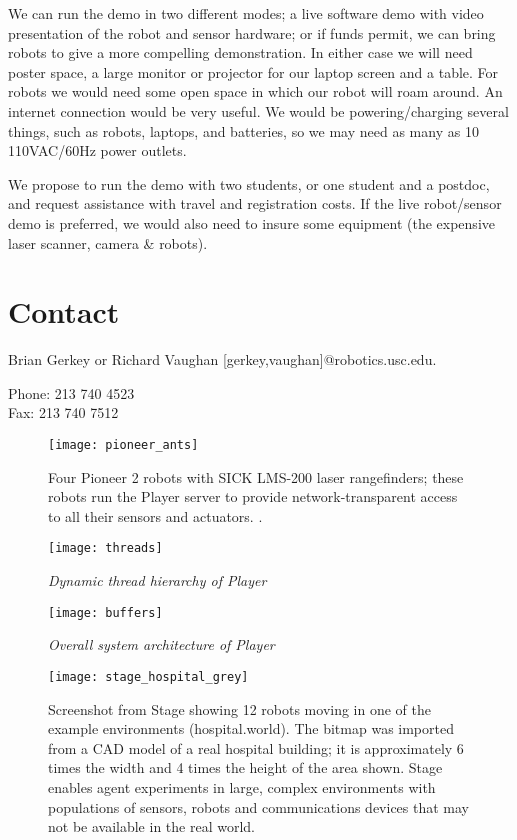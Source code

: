 \documentclass[10pt]{article}
\begin{document}
We can run the demo in two different modes; a live software demo with
video presentation of the robot and sensor hardware; or if funds
permit, we can bring robots to give a more compelling demonstration.
In either case we will need poster space, a large monitor or projector
for our laptop screen and a table. For robots we would need some open
space in which our robot will roam around. An internet connection
would be very useful.  We would be powering/charging several things,
such as robots, laptops, and batteries, so we may need as many as 10
110VAC/60Hz power outlets.

We propose to run the demo with two students, or one student and a
postdoc, and request assistance with travel and registration costs. If
the live robot/sensor demo is preferred, we would also need to insure
some equipment (the expensive laser scanner, camera \& robots).

\section*{Contact}

Brian Gerkey or Richard Vaughan [gerkey,vaughan]@robotics.usc.edu. 

\noindent Phone: 213 740 4523\\
Fax: 213 740 7512


\begin{figure}
\begin{center}
\texttt{[image: pioneer\_ants]}
\caption{\label{fig:pioneers}Four Pioneer 2 robots with SICK LMS-200 laser rangefinders; these robots run the Player server to provide network-transparent access to all their sensors and actuators. .}
\end{center}
\end{figure}


\begin{figure}
 \centering
\texttt{[image: threads]}
  \caption{{\sl Dynamic thread hierarchy of Player}}
\label{figure:threads}
 \end{figure} 

\begin{figure}
 \centering
\texttt{[image: buffers]}
  \caption{{\sl Overall system architecture of Player}}
  \label{figure:buffers}
\end{figure} 

 \begin{figure}
    \begin{center}
      \texttt{[image: stage\_hospital\_grey]}
 \caption{\label{fig:hospital}Screenshot from Stage showing 12 robots moving 
   in one of the example environments (hospital.world). The bitmap was
   imported from a CAD model of a real hospital building; it is
   approximately 6 times the width and 4 times the height of the area
   shown. Stage enables agent experiments in large, complex
   environments with populations of sensors, robots and communications
   devices that may not be available in the real world. }
\end{center}
\end{figure}
\end{document}
